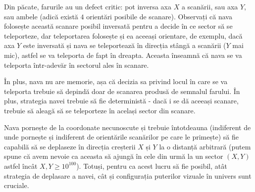 \documentclass[12pt]{article}
\begin{document}
Din păcate, farurile au un defect critic: pot inversa axa $X$ a scanării, sau axa $Y$, sau ambele (adică există $4$ orientări posibile de scanare). Observați că nava folosește această scanare posibil inversată pentru a decide în ce sector să se teleporteze, dar teleportarea folosește și ea aceeași orientare, de exemplu, dacă axa $Y$ este inversată și nava se teleportează în direcția stângă a scanării ($Y$ mai mic), astfel se va teleporta de fapt în dreapta. Aceasta înseamnă că nava se va teleporta într-adevăr în sectorul ales în scanare.


În plus, nava nu are memorie, așa că decizia sa privind locul în care se va teleporta trebuie să depindă doar de scanarea produsă de semnalul farului. În plus, strategia navei trebuie să fie deterministă - dacă i se dă aceeași scanare, trebuie să aleagă să se teleporteze în același sector din scanare.


Nava pornește de la coordonate necunoscute și trebuie întotdeauna (indiferent de unde pornește și indiferent de orientările scanărilor pe care le primește) să fie capabilă să se deplaseze în direcția creșterii $X$ și $Y$ la o distanță arbitrară (putem spune că avem nevoie ca aceasta să ajungă în cele din urmă la un sector $(X, Y)$ astfel încât $X, Y \geq 10^{100}$). Totuși, pentru ca acest lucru să fie posibil, atât strategia de deplasare a navei, cât și configurația puterilor vizuale în univers sunt cruciale.

\end{document}
